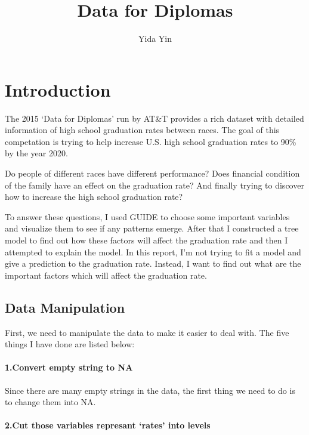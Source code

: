 \documentclass[]{article}
\title{Data for Diplomas}
\author{Yida Yin}
\date{}
\begin{document}
\maketitle


\section{Introduction}\label{introduction}

The 2015 `Data for Diplomas' run by AT\&T provides a rich dataset with
detailed information of high school graduation rates between races. The
goal of this competation is trying to help increase U.S. high school
graduation rates to 90\% by the year 2020.

Do people of different races have different performance? Does financial
condition of the family have an effect on the graduation rate? And
finally trying to discover how to increase the high school graduation
rate?

To answer these questions, I used GUIDE to choose some important
variables and visualize them to see if any patterns emerge. After that I
constructed a tree model to find out how these factors will affect the
graduation rate and then I attempted to explain the model. In this
report, I'm not trying to fit a model and give a prediction to the
graduation rate. Instead, I want to find out what are the important
factors which will affect the graduation rate.

\subsection{Data Manipulation}\label{data-manipulation}

First, we need to manipulate the data to make it easier to deal with.
The five things I have done are listed below:

\paragraph{1.Convert empty string to
NA}\label{convert-empty-string-to-na}

Since there are many empty strings in the data, the first thing we need
to do is to change them into NA.

\paragraph{2.Cut those variables represant `rates' into
levels}\label{cut-those-variables-represant-rates-into-levels}
\end{document}
